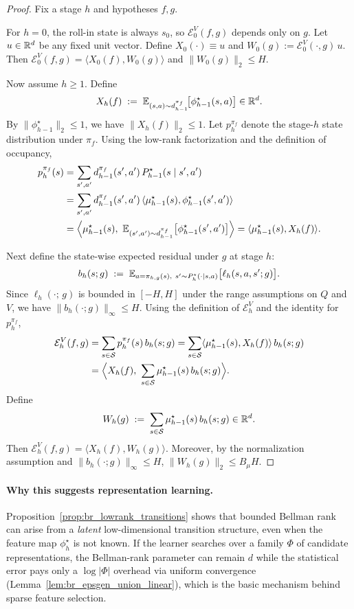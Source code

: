 \begin{proof}
Fix a stage $h$ and hypotheses $f,g$.

For $h=0$, the roll-in state is always $s_0$, so $\mathcal{E}_0^{V}(f,g)$ depends only on $g$.
Let $u\in\mathbb{R}^d$ be any fixed unit vector. Define $X_0(\cdot)\equiv u$ and
$W_0(g):=\mathcal{E}_0^{V}(\cdot,g)\,u$. Then
$\mathcal{E}_0^{V}(f,g)=\langle X_0(f),W_0(g)\rangle$ and $\|W_0(g)\|_2\le H$.

Now assume $h\ge 1$. Define
\[
X_h(f)
\;:=\;
\mathbb{E}_{(s,a)\sim d_{h-1}^{\pi_f}}\!\big[\phi_{h-1}^\star(s,a)\big]\in\mathbb{R}^d.
\]
By $\|\phi_{h-1}^\star\|_2\le 1$, we have $\|X_h(f)\|_2\le 1$.
Let $p_h^{\pi_f}$ denote the stage-$h$ state distribution under $\pi_f$.
Using the low-rank factorization and the definition of occupancy,
\begin{align*}
p_h^{\pi_f}(s)
&=
\sum_{s',a'} d_{h-1}^{\pi_f}(s',a')\,P_{h-1}^\star(s\mid s',a')\\
&=
\sum_{s',a'} d_{h-1}^{\pi_f}(s',a')\,\langle \mu_{h-1}^\star(s),\phi_{h-1}^\star(s',a')\rangle\\
&=
\Big\langle \mu_{h-1}^\star(s),\ \mathbb{E}_{(s',a')\sim d_{h-1}^{\pi_f}}\big[\phi_{h-1}^\star(s',a')\big]\Big\rangle
=
\langle \mu_{h-1}^\star(s), X_h(f)\rangle.
\end{align*}

Next define the state-wise expected residual under $g$ at stage $h$:
\[
b_h(s;g)
\;:=\;
\mathbb{E}_{a=\pi_{h,g}(s),\ s'\sim P_h^\star(\cdot\mid s,a)}\big[\ell_h(s,a,s';g)\big].
\]
Since $\ell_h(\cdot;\,g)$ is bounded in $[-H,H]$ under the range assumptions on $Q$ and $V$,
we have $\|b_h(\cdot;g)\|_\infty\le H$.
Using the definition of $\mathcal{E}_h^V$ and the identity for $p_h^{\pi_f}$,
\begin{align*}
\mathcal{E}_h^{V}(f,g)
&=
\sum_{s\in\Scal} p_h^{\pi_f}(s)\,b_h(s;g)
=
\sum_{s\in\Scal}\langle \mu_{h-1}^\star(s), X_h(f)\rangle\,b_h(s;g)\\
&=
\Big\langle X_h(f),\ \sum_{s\in\Scal}\mu_{h-1}^\star(s)\,b_h(s;g)\Big\rangle.
\end{align*}
Define
\[
W_h(g)
\;:=\;
\sum_{s\in\mathcal{S}}\mu_{h-1}^\star(s)\,b_h(s;g)\in\mathbb{R}^d.
\]
Then $\mathcal{E}_h^{V}(f,g)=\langle X_h(f),W_h(g)\rangle$.
Moreover, by the normalization assumption and $\|b_h(\cdot;g)\|_\infty\le H$,
$\|W_h(g)\|_2\le B_\mu H$.
\end{proof}

\paragraph{Why this suggests representation learning.}
Proposition~\ref{prop:br_lowrank_transitions} shows that bounded Bellman rank can arise from a
\emph{latent} low-dimensional transition structure, even when the feature map
$\phi_h^\star$ is not known.  If the learner searches over a family $\Phi$ of candidate
representations, the Bellman-rank parameter can remain $d$ while the statistical error pays only a
$\log|\Phi|$ overhead via uniform convergence (Lemma~\ref{lem:br_epsgen_union_linear}), which is the
basic mechanism behind sparse feature selection.

